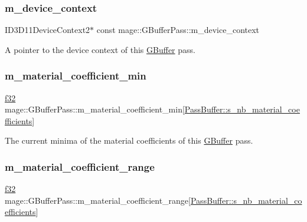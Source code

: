 \subsubsection{\texorpdfstring{m\+\_\+device\+\_\+context}{m\_device\_context}}
{\footnotesize\ttfamily I\+D3\+D11\+Device\+Context2$\ast$ const mage\+::\+G\+Buffer\+Pass\+::m\+\_\+device\+\_\+context\hspace{0.3cm}{\ttfamily [private]}}

A pointer to the device context of this \hyperlink{structmage_1_1_g_buffer}{G\+Buffer} pass. \hypertarget{classmage_1_1_g_buffer_pass_a2fdb9c485431181134e6a535dfa47551}{}\label{classmage_1_1_g_buffer_pass_a2fdb9c485431181134e6a535dfa47551} 
\subsubsection{\texorpdfstring{m\+\_\+material\+\_\+coefficient\+\_\+min}{m\_material\_coefficient\_min}}
{\footnotesize\ttfamily \hyperlink{namespacemage_a6a44ad388483959dc4dff9f2aef91431}{f32} mage\+::\+G\+Buffer\+Pass\+::m\+\_\+material\+\_\+coefficient\+\_\+min\mbox{[}\hyperlink{structmage_1_1_pass_buffer_a453e18abdf29c4ebb08d9e002a952bf2}{Pass\+Buffer\+::s\+\_\+nb\+\_\+material\+\_\+coefficients}\mbox{]}\hspace{0.3cm}{\ttfamily [private]}}

The current minima of the material coefficients of this \hyperlink{structmage_1_1_g_buffer}{G\+Buffer} pass. \hypertarget{classmage_1_1_g_buffer_pass_a6bfe0a54abbb477a3ade9c0b0073d2c2}{}\label{classmage_1_1_g_buffer_pass_a6bfe0a54abbb477a3ade9c0b0073d2c2} 
\subsubsection{\texorpdfstring{m\+\_\+material\+\_\+coefficient\+\_\+range}{m\_material\_coefficient\_range}}
{\footnotesize\ttfamily \hyperlink{namespacemage_a6a44ad388483959dc4dff9f2aef91431}{f32} mage\+::\+G\+Buffer\+Pass\+::m\+\_\+material\+\_\+coefficient\+\_\+range\mbox{[}\hyperlink{structmage_1_1_pass_buffer_a453e18abdf29c4ebb08d9e002a952bf2}{Pass\+Buffer\+::s\+\_\+nb\+\_\+material\+\_\+coefficients}\mbox{]}\hspace{0.3cm}{\ttfamily [private]}}

